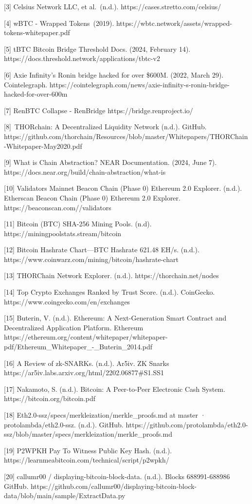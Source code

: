 \documentclass[
]{article}
\begin{document}
{{[}3{]} }{Celsius Network LLC, et al.}{~(n.d.). https://cases.stretto.com/celsius/}

{{[}4{]} }{wBTC - Wrapped Tokens}{~(2019). https://wbtc.network/assets/wrapped-tokens-whitepaper.pdf}

{{[}5{]} }{tBTC Bitcoin Bridge \textbar{} Threshold Docs}{. (2024,
February 14). https://docs.threshold.network/applications/tbtc-v2}

{{[}6{]} }{Axie Infinity's Ronin bridge hacked for over \$600M}{. (2022,
March 29). Cointelegraph. https://cointelegraph.com/news/axie-infinity-s-ronin-bridge-hacked-for-over-600m}

{{[}7{]} }{RenBTC Collapse -
RenBridge https://bridge.renproject.io/}

{{[}8{]}}{~THORchain: A Decentralized Liquidity Network }{(n.d.).
GitHub. https://github.com/thorchain/Resources/blob/master/Whitepapers/THORChain-Whitepaper-May2020.pdf}

{{[}9{]} }{What is Chain Abstraction? \textbar{} NEAR Documentation}{.
(2024, June
7). https://docs.near.org/build/chain-abstraction/what-is}

{{[}10{]} }{Validators \textbar{} Mainnet Beacon Chain (Phase 0)
Ethereum 2.0 Explorer}{. (n.d.). Etherscan Beacon Chain (Phase 0) Ethereum 2.0 Explorer. https://beaconscan.com//validators}

{{[}11{]} }{Bitcoin (BTC) SHA-256 \textbar{} Mining Pools}{. (n.d). https://miningpoolstats.stream/bitcoin}

{{[}12{]} }{Bitcoin Hashrate Chart---BTC Hashrate 621.48 EH/s}{.
(n.d.). https://www.coinwarz.com/mining/bitcoin/hashrate-chart}

{{[}13{]} }{THORChain Network Explorer}{. (n.d.). https://thorchain.net/nodes}

{{[}14{]} }{Top Crypto Exchanges Ranked by Trust Score}{. (n.d.).
CoinGecko. https://www.coingecko.com/en/exchanges}

{{[}15{]} Buterin, V. (n.d.). }{Ethereum: A Next-Generation Smart
Contract and Decentralized Application Platform. Ethereum https://ethereum.org/content/whitepaper/whitepaper-pdf/Ethereum\_Whitepaper\_-\_Buterin\_2014.pdf}

{{[}16{]} }{A Review of zk-SNARKs}{. (n.d.). Ar5iv. ZK Snarks
https://ar5iv.labs.arxiv.org/html/2202.06877\#S1.SS1}

{{[}17{]} Nakamoto, S. (n.d.). }{Bitcoin: A Peer-to-Peer Electronic Cash
System. https://bitcoin.org/bitcoin.pdf}

{{[}18{]} }{Eth2.0-ssz/specs/merkleization/merkle\_proofs.md at master ·
protolambda/eth2.0-ssz}{. (n.d.). GitHub. https://github.com/protolambda/eth2.0-ssz/blob/master/specs/merkleization/merkle\_proofs.md}

{{[}19{]} }{P2WPKH \textbar{} Pay To Witness Public Key Hash}{. (n.d.). https://learnmeabitcoin.com/technical/script/p2wpkh/}

{{[}20{]} }{callumr00 / displaying-bitcoin-block-data}{. (n.d.). Blocks
688991-688986 GitHub. https://github.com/callumr00/displaying-bitcoin-block-data/blob/main/sample/ExtractData.py}
\end{document}
